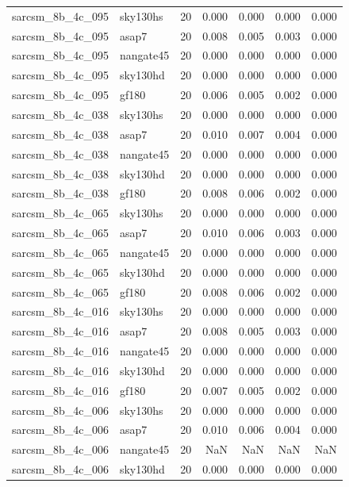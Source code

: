 \begin{tabular}{llrrrrr}
sarcsm\_8b\_4c\_095 & sky130hs & 20 & 0.000 & 0.000 & 0.000 & 0.000 \\
sarcsm\_8b\_4c\_095 & asap7 & 20 & 0.008 & 0.005 & 0.003 & 0.000 \\
sarcsm\_8b\_4c\_095 & nangate45 & 20 & 0.000 & 0.000 & 0.000 & 0.000 \\
sarcsm\_8b\_4c\_095 & sky130hd & 20 & 0.000 & 0.000 & 0.000 & 0.000 \\
sarcsm\_8b\_4c\_095 & gf180 & 20 & 0.006 & 0.005 & 0.002 & 0.000 \\
sarcsm\_8b\_4c\_038 & sky130hs & 20 & 0.000 & 0.000 & 0.000 & 0.000 \\
sarcsm\_8b\_4c\_038 & asap7 & 20 & 0.010 & 0.007 & 0.004 & 0.000 \\
sarcsm\_8b\_4c\_038 & nangate45 & 20 & 0.000 & 0.000 & 0.000 & 0.000 \\
sarcsm\_8b\_4c\_038 & sky130hd & 20 & 0.000 & 0.000 & 0.000 & 0.000 \\
sarcsm\_8b\_4c\_038 & gf180 & 20 & 0.008 & 0.006 & 0.002 & 0.000 \\
sarcsm\_8b\_4c\_065 & sky130hs & 20 & 0.000 & 0.000 & 0.000 & 0.000 \\
sarcsm\_8b\_4c\_065 & asap7 & 20 & 0.010 & 0.006 & 0.003 & 0.000 \\
sarcsm\_8b\_4c\_065 & nangate45 & 20 & 0.000 & 0.000 & 0.000 & 0.000 \\
sarcsm\_8b\_4c\_065 & sky130hd & 20 & 0.000 & 0.000 & 0.000 & 0.000 \\
sarcsm\_8b\_4c\_065 & gf180 & 20 & 0.008 & 0.006 & 0.002 & 0.000 \\
sarcsm\_8b\_4c\_016 & sky130hs & 20 & 0.000 & 0.000 & 0.000 & 0.000 \\
sarcsm\_8b\_4c\_016 & asap7 & 20 & 0.008 & 0.005 & 0.003 & 0.000 \\
sarcsm\_8b\_4c\_016 & nangate45 & 20 & 0.000 & 0.000 & 0.000 & 0.000 \\
sarcsm\_8b\_4c\_016 & sky130hd & 20 & 0.000 & 0.000 & 0.000 & 0.000 \\
sarcsm\_8b\_4c\_016 & gf180 & 20 & 0.007 & 0.005 & 0.002 & 0.000 \\
sarcsm\_8b\_4c\_006 & sky130hs & 20 & 0.000 & 0.000 & 0.000 & 0.000 \\
sarcsm\_8b\_4c\_006 & asap7 & 20 & 0.010 & 0.006 & 0.004 & 0.000 \\
sarcsm\_8b\_4c\_006 & nangate45 & 20 & NaN & NaN & NaN & NaN \\
sarcsm\_8b\_4c\_006 & sky130hd & 20 & 0.000 & 0.000 & 0.000 & 0.000 \\

\end{tabular}
